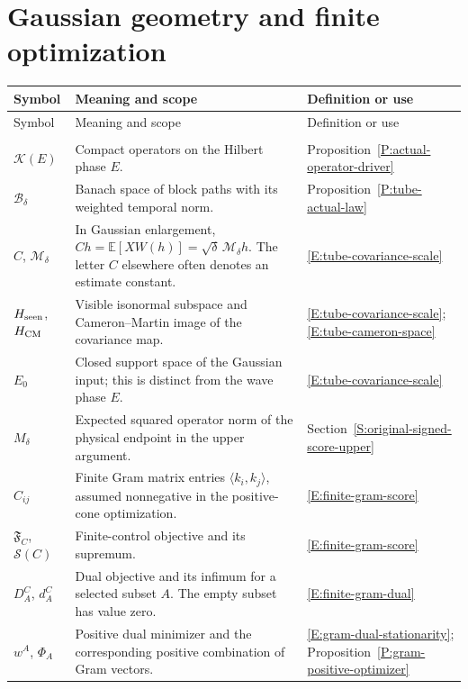 \section*{Gaussian geometry and finite optimization}
\begin{longtable}{@{}>{\raggedright\arraybackslash}p{}
  >{\raggedright\arraybackslash}p{}
  >{\raggedright\arraybackslash}p{}@{}}
  \toprule
  Symbol & Meaning and scope & Definition or use \\
  \midrule
  \endfirsthead
  \toprule
  Symbol & Meaning and scope & Definition or use \\
  \midrule
  \endhead
  \midrule
  \multicolumn{3}{r}{\emph{Continued on the next page}} \\
  \endfoot
  \bottomrule
  \endlastfoot
  $\mathcal{K}(E)$ &
  Compact operators on the Hilbert phase $E$. &
  Proposition~\ref{P:actual-operator-driver} \\[5pt]
  $\mathscr{B}_\delta$ &
  Banach space of block paths with its weighted temporal norm. &
  Proposition~\ref{P:tube-actual-law} \\[5pt]
  $C$, $\mathcal{M}_\delta$ &
  In Gaussian enlargement, $Ch = \mathbb{E}[XW(h)] =
  \sqrt\delta\,\mathcal{M}_\delta h$. The letter $C$ elsewhere often denotes an
  estimate constant. &
  \eqref{E:tube-covariance-scale} \\[5pt]
  $H_{\rm seen}$, $H_{\rm CM}$ &
  Visible isonormal subspace and Cameron--Martin image of the covariance map. &
  \eqref{E:tube-covariance-scale}; \eqref{E:tube-cameron-space} \\[5pt]
  $E_0$ &
  Closed support space of the Gaussian input; this is distinct from the wave
  phase $E$. &
  \eqref{E:tube-covariance-scale} \\[5pt]
  $M_\delta$ &
  Expected squared operator norm of the physical endpoint in the upper argument.
  &
  Section~\ref{S:original-signed-score-upper} \\[5pt]
  $C_{ij}$ &
  Finite Gram matrix entries $\langle k_i,k_j\rangle$, assumed nonnegative in
  the positive-cone optimization. &
  \eqref{E:finite-gram-score} \\[5pt]
  $\mathfrak{F}_C$, $\mathscr{S}(C)$ &
  Finite-control objective and its supremum. &
  \eqref{E:finite-gram-score} \\[5pt]
  $D_A^C$, $d_A^C$ &
  Dual objective and its infimum for a selected subset $A$. The empty subset has
  value zero. &
  \eqref{E:finite-gram-dual} \\[5pt]
  $w^A$, $\Phi_A$ &
  Positive dual minimizer and the corresponding positive combination of Gram
  vectors. &
  \eqref{E:gram-dual-stationarity}; Proposition~\ref{P:gram-positive-optimizer}
  \\[5pt]
\end{longtable}

